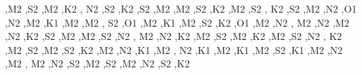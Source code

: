 \textquotesingle{},\textquotesingle{}M2 \textquotesingle{},\textquotesingle{}S2 \textquotesingle{},\textquotesingle{}M2 \textquotesingle{},\textquotesingle{}K2 \textquotesingle{}, \textquotesingle{}N2 \textquotesingle{},\textquotesingle{}S2 \textquotesingle{},\textquotesingle{}K2 \textquotesingle{},\textquotesingle{}S2 \textquotesingle{},\textquotesingle{}M2 \textquotesingle{},\textquotesingle{}M2 \textquotesingle{},\textquotesingle{}S2 \textquotesingle{},\textquotesingle{}K2 \textquotesingle{},\textquotesingle{}M2 \textquotesingle{},\textquotesingle{}S2 \textquotesingle{}, \textquotesingle{}K2 \textquotesingle{},\textquotesingle{}S2 \textquotesingle{},\textquotesingle{}M2 \textquotesingle{},\textquotesingle{}N2 \textquotesingle{},\textquotesingle{}O1 \textquotesingle{},\textquotesingle{}N2 \textquotesingle{},\textquotesingle{}M2 \textquotesingle{},\textquotesingle{}K1 \textquotesingle{},\textquotesingle{}M2 \textquotesingle{},\textquotesingle{}M2 \textquotesingle{}, \textquotesingle{}S2 \textquotesingle{},\textquotesingle{}O1 \textquotesingle{},\textquotesingle{}M2 \textquotesingle{},\textquotesingle{}K1 \textquotesingle{},\textquotesingle{}M2 \textquotesingle{},\textquotesingle{}S2 \textquotesingle{},\textquotesingle{}K2 \textquotesingle{},\textquotesingle{}O1 \textquotesingle{},\textquotesingle{}M2 \textquotesingle{},\textquotesingle{}N2 \textquotesingle{}, \textquotesingle{}M2 \textquotesingle{},\textquotesingle{}N2 \textquotesingle{},\textquotesingle{}M2 \textquotesingle{},\textquotesingle{}N2 \textquotesingle{},\textquotesingle{}K2 \textquotesingle{},\textquotesingle{}S2 \textquotesingle{},\textquotesingle{}M2 \textquotesingle{},\textquotesingle{}M2 \textquotesingle{},\textquotesingle{}S2 \textquotesingle{},\textquotesingle{}N2 \textquotesingle{}, \textquotesingle{}M2 \textquotesingle{},\textquotesingle{}N2 \textquotesingle{},\textquotesingle{}K2 \textquotesingle{},\textquotesingle{}M2 \textquotesingle{},\textquotesingle{}S2 \textquotesingle{},\textquotesingle{}M2 \textquotesingle{},\textquotesingle{}K2 \textquotesingle{},\textquotesingle{}M2 \textquotesingle{},\textquotesingle{}S2 \textquotesingle{},\textquotesingle{}N2 \textquotesingle{}, \textquotesingle{}K2 \textquotesingle{},\textquotesingle{}M2 \textquotesingle{},\textquotesingle{}S2 \textquotesingle{},\textquotesingle{}M2 \textquotesingle{},\textquotesingle{}S2 \textquotesingle{},\textquotesingle{}K2 \textquotesingle{},\textquotesingle{}M2 \textquotesingle{},\textquotesingle{}N2 \textquotesingle{},\textquotesingle{}K1 \textquotesingle{},\textquotesingle{}M2 \textquotesingle{}, \textquotesingle{}N2 \textquotesingle{},\textquotesingle{}K1 \textquotesingle{},\textquotesingle{}M2 \textquotesingle{},\textquotesingle{}K1 \textquotesingle{},\textquotesingle{}M2 \textquotesingle{},\textquotesingle{}S2 \textquotesingle{},\textquotesingle{}K1 \textquotesingle{},\textquotesingle{}M2 \textquotesingle{},\textquotesingle{}N2 \textquotesingle{},\textquotesingle{}M2 \textquotesingle{}, \textquotesingle{}M2 \textquotesingle{},\textquotesingle{}N2 \textquotesingle{},\textquotesingle{}S2 \textquotesingle{},\textquotesingle{}M2 \textquotesingle{},\textquotesingle{}S2 \textquotesingle{},\textquotesingle{}M2 \textquotesingle{},\textquotesingle{}N2 \textquotesingle{},\textquotesingle{}S2 \textquotesingle{},\textquotesingle{}K2 